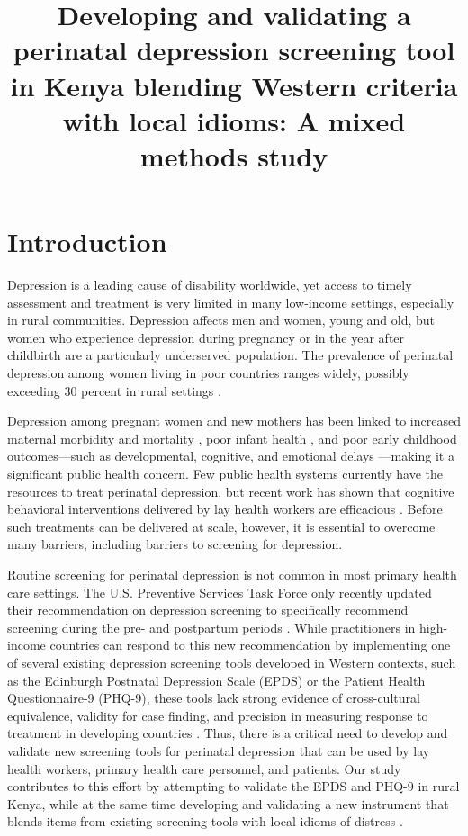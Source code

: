 \documentclass[man,natbib,longtable]{apa6}\usepackage[]{graphicx}\usepackage[]{color}
\title{Developing and validating a perinatal depression screening tool in Kenya blending Western criteria with local idioms: A mixed methods study}
\begin{document}
\maketitle



\section{Introduction}

Depression is a leading cause of disability worldwide, yet access to timely assessment and treatment is very limited in many low-income settings, especially in rural communities. Depression affects men and women, young and old, but women who experience depression during pregnancy or in the year after childbirth are a particularly underserved population. The prevalence of perinatal depression among women living in poor countries ranges widely, possibly exceeding 30 percent in rural settings \citep{Villegas:2011}. 

Depression among pregnant women and new mothers has been linked to increased maternal morbidity and mortality \citep{Oates:2003,khalifeh:2016}, poor infant health \citep{Field:2004,rahman:2016,grigoriadis:2013,surkan:2016,gelaye:2016}, and poor early childhood outcomes---such as developmental, cognitive, and emotional delays \citep{Beck:1998,junge:2017,gentile:2017}---making it a significant public health concern. Few public health systems currently have the resources to treat perinatal depression, but recent work has shown that cognitive behavioral interventions delivered by lay health workers are efficacious \citep{Rahman:2008,joshi:2014}. Before such treatments can be delivered at scale, however, it is essential to overcome many barriers, including barriers to screening for depression. 

Routine screening for perinatal depression is not common in most primary health care settings. The U.S. Preventive Services Task Force only recently updated their recommendation on depression screening to specifically recommend screening during the pre- and postpartum periods \citep{Siu:2016}. While practitioners in high-income countries can respond to this new recommendation by implementing one of several existing depression screening tools developed in Western contexts, such as the Edinburgh Postnatal Depression Scale (EPDS) or the Patient Health Questionnaire-9 (PHQ-9), these tools lack strong evidence of cross-cultural equivalence, validity for case finding, and precision in measuring response to treatment in developing countries \citep{Sweetland:2014,Tsai:2013}. Thus, there is a critical need to develop and validate new screening tools for perinatal depression that can be used by lay health workers, primary health care personnel, and patients. Our study contributes to this effort by attempting to validate the EPDS and PHQ-9 in rural Kenya, while at the same time developing and validating a new instrument that blends items from existing screening tools with local idioms of distress \citep{Kohrt:2011}. 
\end{document}
